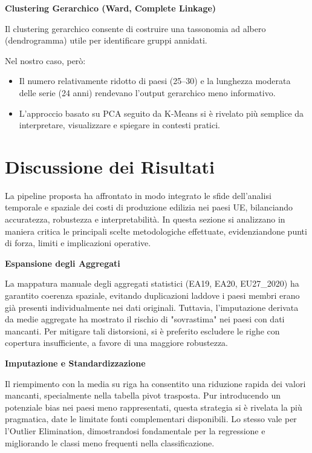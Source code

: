\documentclass[conference]{IEEEtran}
\begin{document}
\vspace{1em}\noindent\textbf{Clustering Gerarchico (Ward, Complete Linkage)}

Il clustering gerarchico consente di costruire una tassonomia ad albero (dendrogramma) utile per identificare gruppi annidati.

Nel nostro caso, però:
\begin{itemize}
    \item Il numero relativamente ridotto di paesi (25–30) e la lunghezza moderata delle serie (24 anni) rendevano l’output gerarchico meno informativo.
    \item L’approccio basato su PCA seguito da K-Means si è rivelato più semplice da interpretare, visualizzare e spiegare in contesti pratici.
\end{itemize}

\section*{\Large \textbf{Discussione dei Risultati}}

La pipeline proposta ha affrontato in modo integrato le sfide dell’analisi temporale e spaziale dei costi di produzione edilizia nei paesi UE, bilanciando accuratezza, robustezza e interpretabilità. In questa sezione si analizzano in maniera critica le principali scelte metodologiche effettuate, evidenziandone punti di forza, limiti e implicazioni operative.

\vspace{1em}\noindent\textbf{Espansione degli Aggregati}

La mappatura manuale degli aggregati statistici (EA19, EA20, EU27\_2020) ha garantito coerenza spaziale, evitando duplicazioni laddove i paesi membri erano già presenti individualmente nei dati originali. Tuttavia, l’imputazione derivata da medie aggregate ha mostrato il rischio di "sovrastima" nei paesi con dati mancanti. Per mitigare tali distorsioni, si è preferito escludere le righe con copertura insufficiente, a favore di una maggiore robustezza.

\vspace{1em}\noindent\textbf{Imputazione e Standardizzazione}

Il riempimento con la media su riga ha consentito una riduzione rapida dei valori mancanti, specialmente nella tabella pivot trasposta. Pur introducendo un potenziale bias nei paesi meno rappresentati, questa strategia si è rivelata la più pragmatica, date le limitate fonti complementari disponibili.
Lo stesso vale per l'Outlier Elimination, dimostrandosi fondamentale per la regressione e migliorando le classi meno frequenti nella classificazione.
\end{document}

